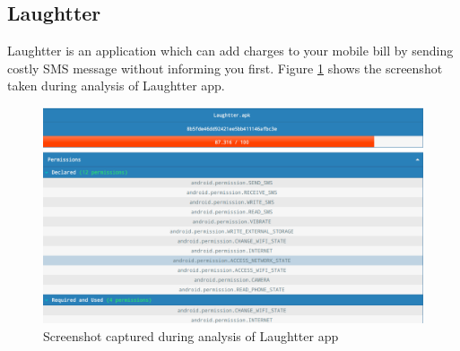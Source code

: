 \subsection{Laughtter}
Laughtter is an application which can add charges to your mobile bill by sending costly SMS message without informing you first. Figure \ref{fig:laughtter} shows the screenshot taken during analysis of Laughtter app.
\begin{figure}[!h]
  \centering
  \includegraphics [scale=0.5] {laughtter.png}
  \caption{Screenshot captured during analysis of Laughtter app}
  \label{fig:laughtter}
\end{figure}
